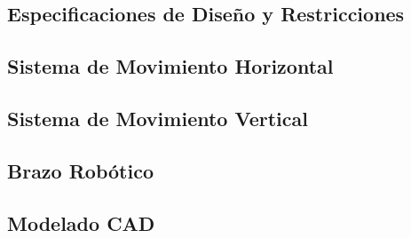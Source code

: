 \documentclass[a4paper,12pt]{report}
\begin{document}
\subsection{Especificaciones de Diseño y Restricciones}


%
%
%

%
\subsection{Sistema de Movimiento Horizontal}


%

\subsection{Sistema de Movimiento Vertical}


%

\subsection{Brazo Robótico}

%


\subsection{Modelado CAD}
%

%
\end{document}
